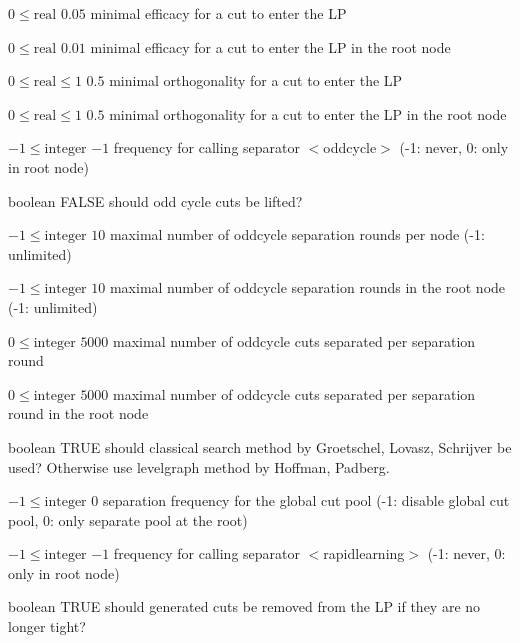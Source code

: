 %
{$0\leq\textrm{real}$}%
{$0.05$}%
{minimal efficacy for a cut to enter the LP}%
{}

%
{$0\leq\textrm{real}$}%
{$0.01$}%
{minimal efficacy for a cut to enter the LP in the root node}%
{}

%
{$0\leq\textrm{real}\leq1$}%
{$0.5$}%
{minimal orthogonality for a cut to enter the LP}%
{}

%
{$0\leq\textrm{real}\leq1$}%
{$0.5$}%
{minimal orthogonality for a cut to enter the LP in the root node}%
{}

%
{$-1\leq\textrm{integer}$}%
{$-1$}%
{frequency for calling separator $<$oddcycle$>$ (-1: never, 0: only in root node)}%
{}

%
{boolean}%
{FALSE}%
{should odd cycle cuts be lifted?}%
{}

%
{$-1\leq\textrm{integer}$}%
{$10$}%
{maximal number of oddcycle separation rounds per node (-1: unlimited)}%
{}

%
{$-1\leq\textrm{integer}$}%
{$10$}%
{maximal number of oddcycle separation rounds in the root node (-1: unlimited)}%
{}

%
{$0\leq\textrm{integer}$}%
{$5000$}%
{maximal number of oddcycle cuts separated per separation round}%
{}

%
{$0\leq\textrm{integer}$}%
{$5000$}%
{maximal number of oddcycle cuts separated per separation round in the root node}%
{}

%
{boolean}%
{TRUE}%
{should classical search method by Groetschel, Lovasz, Schrijver be used? Otherwise use levelgraph method by Hoffman, Padberg.}%
{}

%
{$-1\leq\textrm{integer}$}%
{$0$}%
{separation frequency for the global cut pool (-1: disable global cut pool, 0: only separate pool at the root)}%
{}

%
{$-1\leq\textrm{integer}$}%
{$-1$}%
{frequency for calling separator $<$rapidlearning$>$ (-1: never, 0: only in root node)}%
{}

%
{boolean}%
{TRUE}%
{should generated cuts be removed from the LP if they are no longer tight?}%
{}

